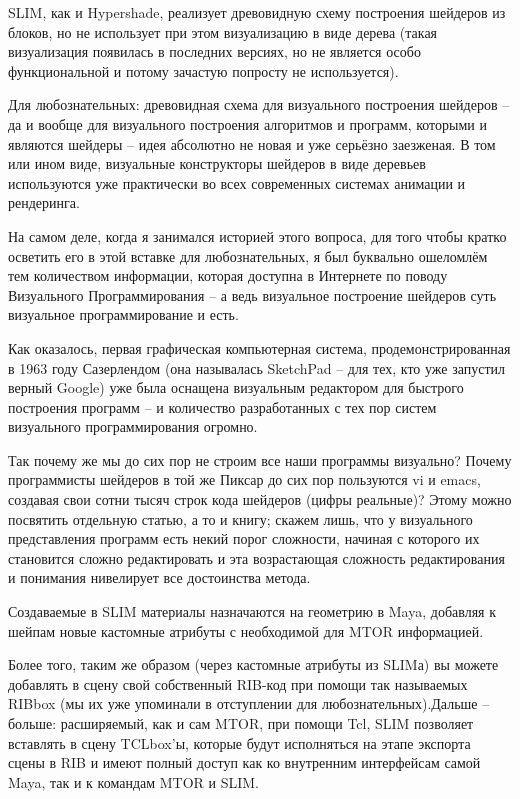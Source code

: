 
 SLIM, как и Hypershade, реализует древовидную схему
    построения шейдеров из блоков, но не использует при этом
    визуализацию в виде дерева (такая визуализация появилась в
    последних версиях, но не является особо функциональной и потому
    зачастую попросту не используется).

 Для
    любознательных: древовидная схема для
    визуального построения шейдеров – да и вообще для визуального
    построения алгоритмов и программ, которыми и являются шейдеры –
    идея абсолютно не новая и уже серьёзно заезженая. В том или ином
    виде, визуальные конструкторы шейдеров в виде деревьев используются
    уже практически во всех современных системах анимации и
    рендеринга.

 На самом
    деле, когда я занимался историей этого вопроса, для того чтобы
    кратко осветить его в этой вставке для любознательных, я был
    буквально ошеломлём тем количеством информации, которая доступна в
    Интернете по поводу Визуального Программирования – а ведь
    визуальное построение шейдеров суть визуальное программирование и
    есть.

 Как
    оказалось, первая графическая компьютерная система,
    продемонстрированная в 1963 году Сазерлендом (она называлась
    SketchPad – для тех, кто уже запустил верный Google) уже была
    оснащена визуальным редактором для быстрого построения программ – и
    количество разработанных с тех пор систем визуального
    программирования огромно.

 Так почему же
    мы до сих пор не строим все наши программы визуально? Почему
    программисты шейдеров в той же Пиксар до сих пор пользуются vi и
    emacs, создавая свои сотни тысяч строк кода шейдеров (цифры
    реальные)? Этому можно посвятить отдельную статью, а то и книгу;
    скажем лишь, что у визуального представления программ есть некий
    порог сложности, начиная с которого их становится сложно
    редактировать и эта возрастающая сложность редактирования и
    понимания нивелирует все достоинства метода.

 Создаваемые в SLIM материалы назначаются на
    геометрию в Maya, добавляя к шейпам новые кастомные атрибуты с
    необходимой для MTOR информацией.

 Более того, таким же образом (через кастомные
    атрибуты из SLIMа) вы можете добавлять в сцену свой собственный
    RIB-код при помощи так называемых RIBbox (мы их уже упоминали в
    отступлении для любознательных).Дальше – больше: расширяемый, как и
    сам MTOR, при помощи Tcl, SLIM позволяет вставлять в сцену
    TCLbox’ы, которые будут исполняться на этапе экспорта сцены в RIB и
    имеют полный доступ как ко внутренним интерфейсам самой Maya, так и
    к командам MTOR и SLIM.

